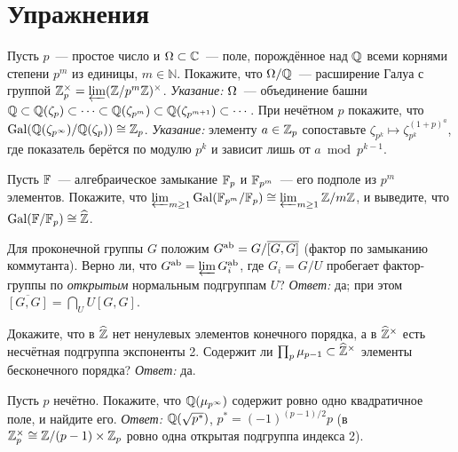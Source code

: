 \section*{Упражнения}

\begin{exercise}[7-1]
Пусть $p$~--- простое число и $\Omega\subset\mathbb C$~--- поле, порождённое над $\mathbb Q$ всеми корнями степени $p^m$ из единицы,
$m\in\mathbb N$. Покажите, что $\Omega/\mathbb Q$~--- расширение Галуа с группой $\mathbb Z_p^\times=\varprojlim(\mathbb Z/p^m\mathbb Z)^\times$.
\emph{Указание:} $\Omega$~--- объединение башни $\mathbb Q\subset\mathbb Q(\zeta_p)\subset\dots\subset\mathbb Q(\zeta_{p^m})\subset
\mathbb Q(\zeta_{p^{m+1}})\subset\cdots$. При нечётном $p$ покажите, что $\operatorname{Gal}(\mathbb Q(\zeta_{p^\infty})/\mathbb Q(\zeta_p))\cong\mathbb Z_p$.
\emph{Указание:} элементу $a\in\mathbb Z_p$ сопоставьте $\zeta_{p^k}\mapsto\zeta_{p^k}^{(1+p)^{a}}$, где показатель берётся по
модулю $p^k$ и зависит лишь от $a\bmod p^{k-1}$.
\end{exercise}

\begin{exercise}[7-2]
Пусть $\mathbb F$~--- алгебраическое замыкание $\mathbb F_p$ и $\mathbb F_{p^m}$~--- его подполе из $p^m$ элементов. Покажите, что
$\varprojlim_{m\ge1}\operatorname{Gal}(\mathbb F_{p^m}/\mathbb F_p)\cong\varprojlim_{m\ge1}\mathbb Z/m\mathbb Z$, и выведите, что $\operatorname{Gal}(\mathbb F/\mathbb F_p)\cong\widehat{\mathbb Z}$.
\end{exercise}

\begin{exercise}[7-3]
Для проконечной группы $G$ положим $G^{\rm ab}=G/\overline{[G,G]}$ (фактор по замыканию коммутанта). Верно ли, что
$G^{\rm ab}=\varprojlim G_i^{\rm ab}$, где $G_i=G/U$ пробегает фактор-группы по \emph{открытым} нормальным подгруппам $U$? \emph{Ответ:} да; при этом $\overline{[G,G]}=\bigcap_UU[G,G]$.
\end{exercise}

\begin{exercise}[7-4]
Докажите, что в $\widehat{\mathbb Z}$ нет ненулевых элементов конечного порядка, а в $\widehat{\mathbb Z}^\times$ есть несчётная подгруппа экспоненты 2.
Содержит ли $\prod_p\mu_{p-1}\subset\widehat{\mathbb Z}^\times$ элементы бесконечного порядка? \emph{Ответ:} да.
\end{exercise}

\begin{exercise}[7-5]
Пусть $p$ нечётно. Покажите, что $\mathbb Q(\mu_{p^\infty})$ содержит ровно одно квадратичное поле, и найдите его.
\emph{Ответ:} $\mathbb Q(\sqrt{p^*})$, $p^*=(-1)^{(p-1)/2}p$ (в $\mathbb Z_p^\times\cong\mathbb Z/(p-1)\times\mathbb Z_p$ ровно одна открытая подгруппа
индекса 2).
\end{exercise}

